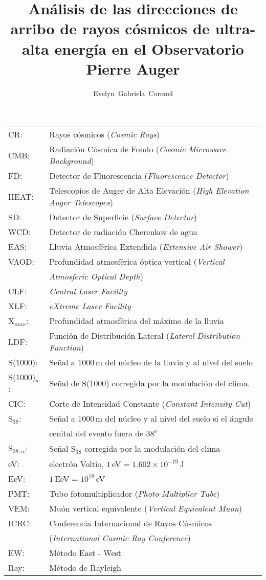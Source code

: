 \documentclass[12pt,papel,twoside,pagebackref]{ibtesis}
\title{Análisis de las direcciones de arribo de rayos cósmicos de ultra-alta energía en el Observatorio Pierre Auger}
\author{Evelyn~Gabriela~Coronel}
\begin{document}
\begin{preliminary}


\begin{abreviaturas}

\begin{tabular}{l l}
CR: 		& Rayos cósmicos  (\emph{Cosmic Rays}) \\
CMB: 		& Radiación Cósmica de Fondo (\emph{Cosmic Microwave Background})\\
FD: 		& Detector de Fluorescencia (\emph{Fluorescence Detector}) \\
HEAT:		& Telescopios de Auger de Alta Elevación (\emph{High Elevation Auger Telescopes})\\
SD: 		& Detector de Superficie (\emph{Surface Detector})  \\
WCD: 		& Detector de radiación Cherenkov de agua\\
EAS: 		& Lluvia Atmosférica Extendida  (\emph{Extensive Air Shower})    \\
VAOD: 		& Profundidad atmosférica óptica vertical (\emph{Vertical} \\
			& \emph{Atmosferic Optical Depth})\\
CLF:		& \emph{Central Laser Facility}\\
XLF:		& \emph{eXtreme Laser Facility}\\
X$_{max}$: 	& Profundidad atmosférica del máximo de la lluvia \\
LDF: 		& Función de Distribución Lateral (\emph{Lateral Distribution Function}) \\
S(1000): 	& Señal a 1000\,m del núcleo de la lluvia y al nivel del suelo \\
S(1000)$_w$:& Señal de S(1000) corregida por la modulación del clima. \\
CIC: 		& Corte de Intensidad Constante (\emph{Constant Intensity Cut}) \\
S$_{38}$: 	& Señal a 1000\,m del núcleo y al nivel del suelo si el ángulo\\
			& cenital del evento fuera de $38^o$\\
S$_{38,w}$: & Señal S$_{38}$ corregida por la modulación del clima \\
eV: 		& electrón Voltio, $1\,$eV$= 1.602\times 10^{-19}\,$J \\
EeV: 		& $1\,$EeV$=10^{18}\,$eV\\
PMT: 		& Tubo fotomultiplicador (\emph{Photo-Multiplier Tube})\\
VEM: 		& Muón vertical equivalente (\emph{Vertical Equivalent Muon})\\
ICRC: 		& Conferencia Internacional de Rayos Cósmicos \\
			& (\emph{International Cosmic Ray Conference})\\
EW:			& Método East - West\\
Ray:		& Método de Rayleigh
\end{tabular}
\end{abreviaturas}


\end{preliminary}
\end{document}
